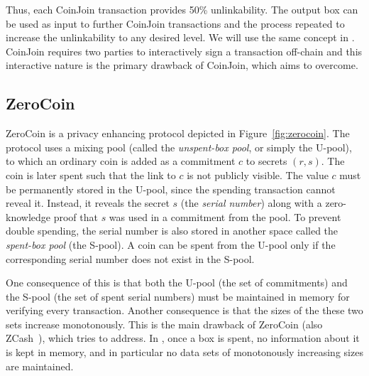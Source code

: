 \documentclass[11pt]{article}
\begin{document}
Thus, each CoinJoin transaction provides 50\% unlinkability. The output box can be used as input to further CoinJoin transactions and the process repeated to increase the unlinkability to any desired level. We will use the same concept in \algname. 
CoinJoin requires two parties to interactively sign a transaction off-chain and this interactive nature is the primary drawback of CoinJoin, which \algname aims to overcome. 

\subsection{ZeroCoin}
\label{zerocoin} 

ZeroCoin is a privacy enhancing protocol depicted in Figure~\ref{fig:zerocoin}. 
The protocol uses a mixing pool (called the {\em unspent-box pool}, or simply the U-pool), to which an ordinary coin is added as a commitment $c$ to secrets $(r, s)$. The coin is later spent such that the link to $c$ is not publicly visible. The value $c$ must be permanently stored in the U-pool, since the spending transaction cannot reveal it. Instead, it reveals the secret $s$ (the {\em serial number}) along with a zero-knowledge proof that $s$ was used in a commitment from the pool. To prevent double spending, the serial number is also stored in another space called the {\em spent-box pool} (the S-pool). A coin can be spent from the U-pool only if the corresponding serial number does not exist in the S-pool. 

One consequence of this is that both the U-pool (the set of commitments) and the S-pool (the set of spent serial numbers) must be maintained in memory for verifying every transaction. 
Another consequence is that the sizes of the these two sets increase monotonously. 
This is the main drawback of ZeroCoin (also ZCash~\cite{zcash}), which \algname tries to address. 
In \algname, once a box is spent, no information about it is kept in memory, and in particular no data sets of monotonously increasing sizes are maintained. 
\end{document}
